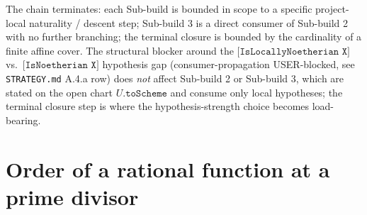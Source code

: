 The chain terminates: each Sub-build is bounded in scope to a
specific project-local naturality / descent step; Sub-build 3 is a
direct consumer of Sub-build 2 with no further branching; the
terminal closure is bounded by the cardinality of a finite affine
cover. The structural blocker around the
\(\texttt{[IsLocallyNoetherian X]}\) vs.\
\(\texttt{[IsNoetherian X]}\) hypothesis gap (consumer-propagation
USER-blocked, see \texttt{STRATEGY.md} A.4.a row) does \emph{not}
affect Sub-build 2 or Sub-build 3, which are stated on the open
chart \(U.\texttt{toScheme}\) and consume only local hypotheses; the
terminal closure step is where the hypothesis-strength choice
becomes load-bearing.
\section{Order of a rational function at a prime divisor}
